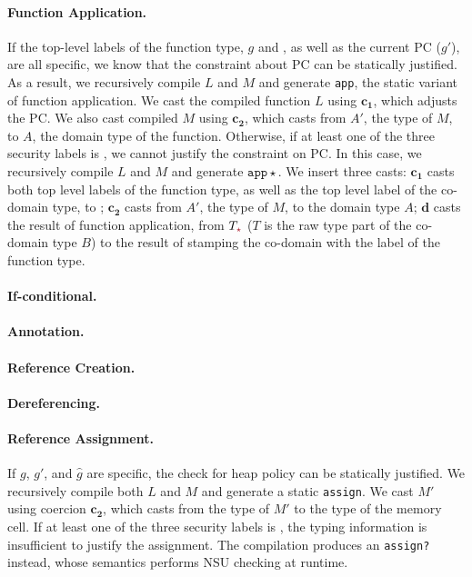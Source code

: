 \paragraph{Function Application.}
If the top-level labels of the function type, $g$ and \gc, as well as the
current PC ($g'$), are all specific, we know that the constraint about PC can be
statically justified. As a result, we recursively compile $L$ and $M$ and
generate \texttt{app}, the static variant of function application. We cast the
compiled function $L$ using $\bm{c_1}$, which adjusts the PC. We also cast
compiled $M$ using $\bm{c_2}$, which casts from $A'$, the type of $M$, to $A$,
the domain type of the function. Otherwise, if at least one of the three
security labels is \unk, we cannot justify the constraint on PC. In this case,
we recursively compile $L$ and $M$ and generate $\mathtt{app}{\star}$. We insert
three casts: $\bm{c_1}$ casts both top level labels of the function type, as
well as the top level label of the co-domain type, to \unk; $\bm{c_2}$ casts
from $A'$, the type of $M$, to the domain type $A$; $\bm{d}$ casts the result of
function application, from $T_{\unk}$ ($T$ is the raw type part of the co-domain
type $B$) to the result of stamping the co-domain with the label of the function
type.

\paragraph{If-conditional.}

\paragraph{Annotation.}

\paragraph{Reference Creation.}

\paragraph{Dereferencing.}

\paragraph{Reference Assignment.} If $g$, $g'$, and $\hat{g}$ are
specific, the check for heap policy can be statically justified. We recursively
compile both $L$ and $M$ and generate a static \texttt{assign}. We cast $M'$
using coercion $\bm{c_2}$, which casts from the type of $M'$ to the type of the
memory cell. If at least one of the three security labels is \unk, the typing
information is insufficient to justify the assignment. The compilation produces
an \texttt{assign?} instead, whose semantics performs NSU checking at runtime.
